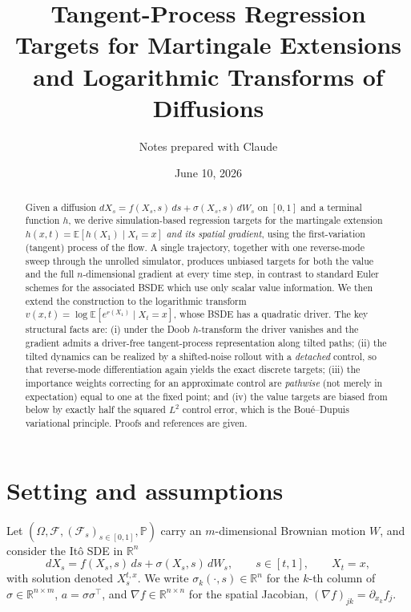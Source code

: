 \documentclass[11pt]{article}
\title{Tangent-Process Regression Targets for Martingale Extensions\\
and Logarithmic Transforms of Diffusions}
\author{Notes prepared with Claude}
\date{June 10, 2026}
\theoremstyle{definition}
\theoremstyle{remark}
\newcommand{\R}{\mathbb{R}}
\newcommand{\E}{\mathbb{E}}
\newcommand{\Pmeas}{\mathbb{P}}
\newcommand{\F}{\mathcal{F}}
\newcommand{\grad}{\nabla}
\begin{document}
\maketitle

\begin{abstract}
Given a diffusion $dX_s = f(X_s,s)\,ds + \sigma(X_s,s)\,dW_s$ on $[0,1]$ and a terminal
function $h$, we derive simulation-based regression targets for the martingale extension
$h(x,t) = \E[h(X_1)\mid X_t=x]$ \emph{and its spatial gradient}, using the first-variation
(tangent) process of the flow. A single trajectory, together with one reverse-mode sweep
through the unrolled simulator, produces unbiased targets for both the value and the full
$n$-dimensional gradient at every time step, in contrast to standard Euler schemes for the
associated BSDE which use only scalar value information. We then extend the construction to
the logarithmic transform $v(x,t) = \log \E[e^{r(X_1)}\mid X_t = x]$, whose BSDE has a
quadratic driver. The key structural facts are: (i) under the Doob $h$-transform the driver
vanishes and the gradient admits a driver-free tangent-process representation along tilted
paths; (ii) the tilted dynamics can be realized by a shifted-noise rollout with a
\emph{detached} control, so that reverse-mode differentiation again yields the exact discrete
targets; (iii) the importance weights correcting for an approximate control are
\emph{pathwise} (not merely in expectation) equal to one at the fixed point; and (iv) the
value targets are biased from below by exactly half the squared $L^2$ control error, which is
the Bou\'e--Dupuis variational principle. Proofs and references are given.
\end{abstract}

\tableofcontents

\section{Setting and assumptions}

Let $(\Omega,\F,(\F_s)_{s\in[0,1]},\Pmeas)$ carry an $m$-dimensional Brownian motion $W$, and
consider the It\^o SDE in $\R^n$
\begin{equation}\label{eq:sde}
dX_s = f(X_s,s)\,ds + \sigma(X_s,s)\,dW_s, \qquad s\in[t,1],\qquad X_t = x,
\end{equation}
with solution denoted $X^{t,x}_s$. We write $\sigma_k(\cdot,s)\in\R^n$ for the $k$-th column
of $\sigma\in\R^{n\times m}$, $a = \sigma\sigma^\top$, and $\grad f \in \R^{n\times n}$ for
the spatial Jacobian, $(\grad f)_{jk} = \partial_{x_k} f_j$.
\end{document}
